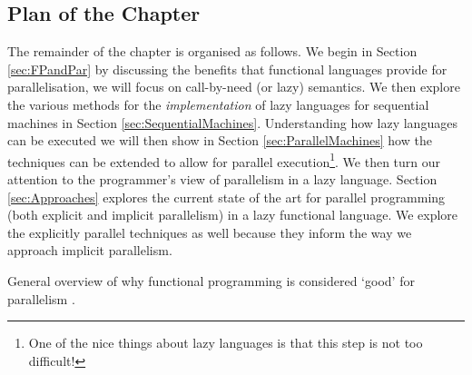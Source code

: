 \subsection*{Plan of the Chapter}

The remainder of the chapter is organised as follows. We begin in Section
\ref{sec:FPandPar} by discussing the benefits that functional languages provide
for parallelisation, we will focus on call-by-need (or lazy) semantics. We then
explore the various methods for the \emph{implementation} of lazy languages for
sequential machines in Section \ref{sec:SequentialMachines}. Understanding how
lazy languages can be executed we will then show in Section
\ref{sec:ParallelMachines} how the techniques can be extended to allow for
parallel execution\footnote{One of the nice things about lazy languages is that
this step is not too difficult!}. We then turn our attention to the
programmer's view of parallelism in a lazy language. Section
\ref{sec:Approaches} explores the current state of the art for parallel
programming (both explicit and implicit parallelism) in a lazy functional
language. We explore the explicitly parallel techniques as well because they
inform the way we approach implicit parallelism.


General overview of why functional programming is considered `good' for
parallelism \citep{hughes:thesis}.
